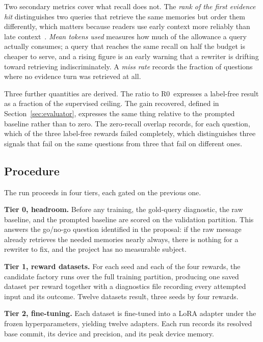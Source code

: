 \documentclass[12pt,letterpaper,oneside]{report}
\newcommand{\Rz}{R0}
\begin{document}
Two secondary metrics cover what recall does not. The \emph{rank of the first
evidence hit} distinguishes two queries that retrieve the same memories but
order them differently, which matters because readers use early context more
reliably than late context~\cite{lostmiddle}. \emph{Mean tokens used} measures
how much of the allowance a query actually consumes; a query that reaches the
same recall on half the budget is cheaper to serve, and a rising figure is an
early warning that a rewriter is drifting toward retrieving indiscriminately.
A \emph{miss rate} records the fraction of questions where no evidence turn was
retrieved at all.

Three further quantities are derived. The ratio to \Rz\ expresses a label-free
result as a fraction of the supervised ceiling. The gain recovered, defined in
Section~\ref{sec:evaluator}, expresses the same thing relative to the prompted
baseline rather than to zero. The zero-recall overlap records, for each
question, which of the three label-free rewards failed completely, which
distinguishes three signals that fail on the same questions from three that
fail on different ones.

\subsection{Procedure}
\label{sec:procedure}

The run proceeds in four tiers, each gated on the previous one.

\textbf{Tier 0, headroom.} Before any training, the gold-query diagnostic, the
raw baseline, and the prompted baseline are scored on the validation partition.
This answers the go/no-go question identified in the proposal: if the raw
message already retrieves the needed memories nearly always, there is nothing
for a rewriter to fix, and the project has no measurable subject.

\textbf{Tier 1, reward datasets.} For each seed and each of the four rewards,
the candidate factory runs over the full training partition, producing one
saved dataset per reward together with a diagnostics file recording every
attempted input and its outcome. Twelve datasets result, three seeds by four
rewards.

\textbf{Tier 2, fine-tuning.} Each dataset is fine-tuned into a LoRA adapter
under the frozen hyperparameters, yielding twelve adapters. Each run records
its resolved base commit, its device and precision, and its peak device memory.
\end{document}
